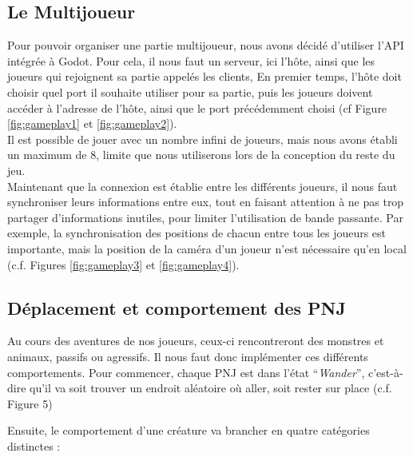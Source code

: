 

\subsection{Le Multijoueur}

Pour pouvoir organiser une partie multijoueur, nous avons décidé d'utiliser l'API intégrée à Godot.
Pour cela, il nous faut un serveur, ici l'hôte, ainsi que les joueurs qui rejoignent sa partie appelés les clients,
En premier temps, l'hôte doit choisir quel port il souhaite utiliser pour sa partie, puis les joueurs doivent accéder à l'adresse de l'hôte, ainsi que le port précédemment choisi (cf Figure \ref{fig:gameplay1} et \ref*{fig:gameplay2}).
\\

Il est possible de jouer avec un nombre infini de joueurs, mais nous avons établi un maximum de 8, limite que nous utiliserons lors de la conception du reste du jeu.
\\

Maintenant que la connexion est établie entre les différents joueurs, il nous faut synchroniser leurs informations entre eux, tout en faisant attention à ne pas trop partager d'informations inutiles, pour limiter l'utilisation de bande passante.
Par exemple, la synchronisation des positions de chacun entre tous les joueurs est importante, mais la position de la caméra d'un joueur n'est nécessaire qu'en local (c.f. Figures \ref*{fig:gameplay3} et \ref*{fig:gameplay4}).

\subsection{Déplacement et comportement des PNJ}

Au cours des aventures de nos joueurs, ceux-ci rencontreront des monstres et animaux, passifs ou agressifs.
Il nous faut donc implémenter ces différents comportements.
Pour commencer, chaque PNJ est dans l'état “\textit{Wander}”, c'est-à-dire qu'il va soit trouver un endroit aléatoire où aller, soit rester sur place (c.f. Figure 5)

Ensuite, le comportement d'une créature va brancher en quatre catégories distinctes :

